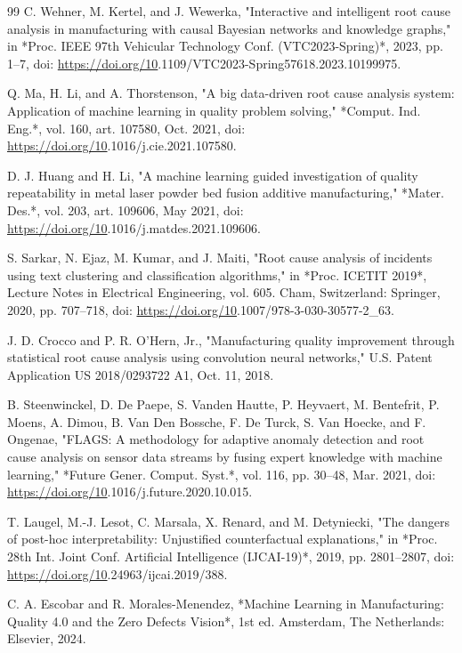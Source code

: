 \begin{thebibliography}{99}
 C. Wehner, M. Kertel, and J. Wewerka, "Interactive and intelligent root cause analysis in manufacturing with causal Bayesian networks and knowledge graphs," in *Proc. IEEE 97th Vehicular Technology Conf. (VTC2023-Spring)*, 2023, pp. 1–7, doi: \url{https://doi.org/10}.1109/VTC2023-Spring57618.2023.10199975.

 Q. Ma, H. Li, and A. Thorstenson, "A big data-driven root cause analysis system: Application of machine learning in quality problem solving," *Comput. Ind. Eng.*, vol. 160, art. 107580, Oct. 2021, doi: \url{https://doi.org/10}.1016/j.cie.2021.107580.

 D. J. Huang and H. Li, "A machine learning guided investigation of quality repeatability in metal laser powder bed fusion additive manufacturing," *Mater. Des.*, vol. 203, art. 109606, May 2021, doi: \url{https://doi.org/10}.1016/j.matdes.2021.109606.

 S. Sarkar, N. Ejaz, M. Kumar, and J. Maiti, "Root cause analysis of incidents using text clustering and classification algorithms," in *Proc. ICETIT 2019*, Lecture Notes in Electrical Engineering, vol. 605. Cham, Switzerland: Springer, 2020, pp. 707–718, doi: \url{https://doi.org/10}.1007/978-3-030-30577-2\_63.

 J. D. Crocco and P. R. O'Hern, Jr., "Manufacturing quality improvement through statistical root cause analysis using convolution neural networks," U.S. Patent Application US 2018/0293722 A1, Oct. 11, 2018.

 B. Steenwinckel, D. De Paepe, S. Vanden Hautte, P. Heyvaert, M. Bentefrit, P. Moens, A. Dimou, B. Van Den Bossche, F. De Turck, S. Van Hoecke, and F. Ongenae, "FLAGS: A methodology for adaptive anomaly detection and root cause analysis on sensor data streams by fusing expert knowledge with machine learning," *Future Gener. Comput. Syst.*, vol. 116, pp. 30–48, Mar. 2021, doi: \url{https://doi.org/10}.1016/j.future.2020.10.015.

 T. Laugel, M.-J. Lesot, C. Marsala, X. Renard, and M. Detyniecki, "The dangers of post-hoc interpretability: Unjustified counterfactual explanations," in *Proc. 28th Int. Joint Conf. Artificial Intelligence (IJCAI-19)*, 2019, pp. 2801–2807, doi: \url{https://doi.org/10}.24963/ijcai.2019/388.

 C. A. Escobar and R. Morales-Menendez, *Machine Learning in Manufacturing: Quality 4.0 and the Zero Defects Vision*, 1st ed. Amsterdam, The Netherlands: Elsevier, 2024.


\end{thebibliography}
